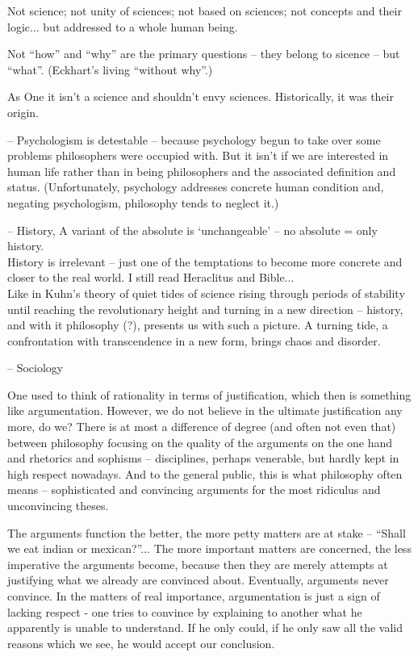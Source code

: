 { Not science; not unity of sciences; not based on 
sciences; not concepts and their logic... but addressed to a whole human being.

Not ``how'' and ``why'' are the primary questions -- they belong to sicence -- 
but ``what''. (Eckhart's living ``without why''.)


As One it isn't a science and shouldn't envy sciences. Historically, it was their 
origin.

-- Psychologism is detestable -- because psychology begun to take over some 
problems philosophers were occupied with. But it isn't if we are 
interested in human life rather than in being philosophers and the 
associated definition and  status.
(Unfortunately, psychology addresses concrete human condition and, negating
psychologism, philosophy tends to neglect it.)

-- History, 
A variant of the absolute is `unchangeable' -- no absolute = only history.
\\
History is irrelevant -- just one of the temptations to become more 
concrete and closer to the real world. I still read Heraclitus and Bible...
\\
Like in Kuhn's theory of quiet tides of science rising through periods of stability
until reaching the revolutionary height and turning in a new direction -- history, and with 
it philosophy (?), presents us with such a picture. A turning tide, a confrontation
with transcendence in a new form, brings chaos and disorder. 

-- Sociology

One used to think of rationality in terms of justification, 
which then is something like argumentation. However, we do not believe in the 
ultimate justification any more, do we? 
There is at most a difference of degree (and often not even that) between
philosophy focusing on the quality of the arguments on the one hand and
rhetorics and sophisms -- disciplines, perhaps venerable, but hardly kept in high
respect nowadays. And to the general public, this is what philosophy often means
-- sophisticated and convincing arguments for the most ridiculus and unconvincing
theses.

The arguments function the better, the more petty matters are at stake -- 
``Shall we eat indian or mexican?''... The more important matters are concerned, 
the less imperative the arguments become, because then they are merely attempts
at justifying what we already are convinced about. 
Eventually, arguments never convince.
In the matters of real importance, 
argumentation is just a sign of lacking respect - one tries to convince by 
explaining to
another what he apparently is unable to understand. If he only could, if he only 
saw all the valid reasons which we see, he would accept our conclusion.


}
